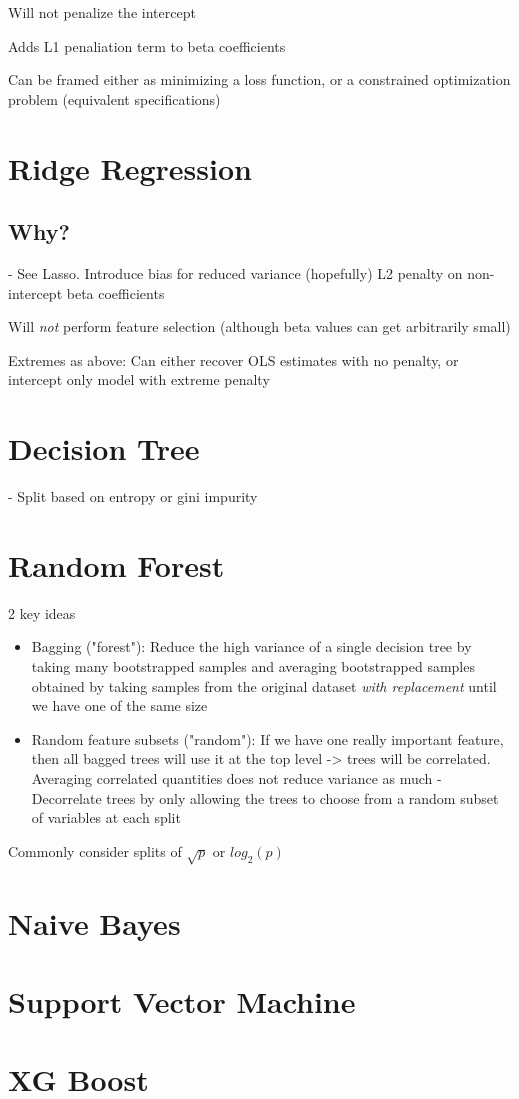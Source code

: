 \documentclass{article}
\begin{document}
Will not penalize the intercept

Adds L1 penaliation term to beta coefficients

Can be framed either as minimizing a loss function, or a constrained optimization problem (equivalent specifications)

\section{Ridge Regression}

\subsection{Why?}
	- See Lasso. Introduce bias for reduced variance (hopefully)
L2 penalty on non-intercept beta coefficients

Will \textit{not} perform feature selection (although beta values can get arbitrarily small)

Extremes as above: Can either recover OLS estimates with no penalty, or intercept only model with extreme penalty

\section{Decision Tree}

- Split based on entropy or gini impurity

\section{Random Forest}
2 key ideas
\begin{itemize}
	\item Bagging ("forest"): Reduce the high variance of a single decision tree by taking many bootstrapped samples and averaging bootstrapped samples obtained by taking samples 	from the original dataset \textit{with replacement} until we have one of the same size
	\item Random feature subsets ("random"): If we have one really important feature, then all bagged trees will use it at the top level -> trees will be correlated. Averaging correlated 		quantities does not reduce variance as much
		- Decorrelate trees by only allowing the trees to choose from a random subset of variables at each split
\end{itemize}

Commonly consider splits of $\sqrt{p}$ or $log_2(p)	$

\section{Naive Bayes}

\section{Support Vector Machine}

\section{XG Boost}
\end{document}
